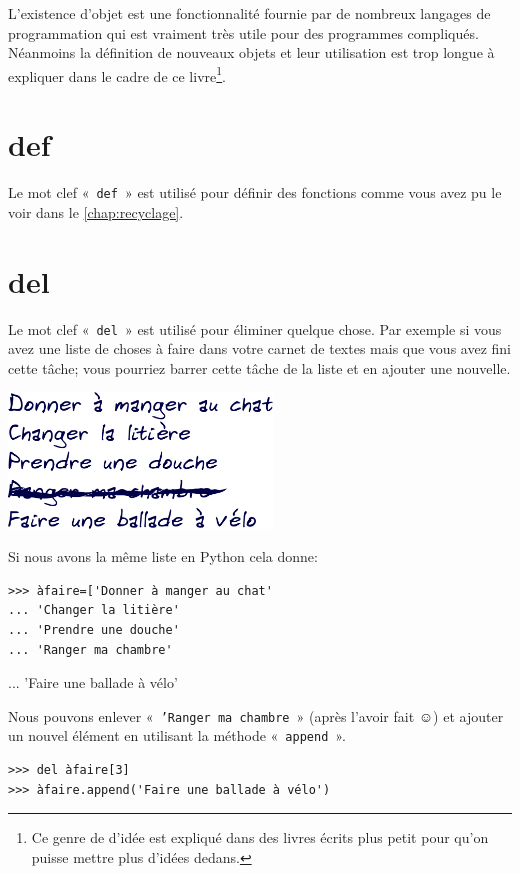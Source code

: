 L'existence d'objet est une fonctionnalité fournie par de nombreux langages de programmation qui est vraiment très utile pour des programmes compliqués. Néanmoins la définition de nouveaux objets et leur utilisation est trop longue à expliquer dans le cadre de ce livre\footnote{Ce genre de d'idée est expliqué dans des livres écrits plus petit pour qu'on puisse mettre plus d'idées dedans.}.

\section*{def}
Le mot clef « \texttt{def} » est utilisé pour définir des fonctions comme vous avez pu le voir dans le \autoref{chap:recyclage}.

\section*{del}
Le mot clef « \texttt{del} » est utilisé pour éliminer quelque chose. Par exemple si vous avez une liste de choses à faire dans votre carnet de textes mais que vous avez fini cette tâche; vous pourriez barrer cette tâche de la liste et en ajouter une nouvelle.

\begin{center}
\includegraphics*[width=70mm]{images/liste2}
\end{center}

Si nous avons la même liste en Python cela donne:
\begin{Verbatim}[frame=single,rulecolor=\color{gray}]
>>> àfaire=['Donner à manger au chat'
... 'Changer la litière'
... 'Prendre une douche'
... 'Ranger ma chambre'
\end{Verbatim}

... 'Faire une ballade à vélo'

Nous pouvons enlever « \texttt{'Ranger ma chambre} » (après l'avoir fait ☺) 
et ajouter un nouvel élément en utilisant la méthode « \texttt{append} ».

\begin{Verbatim}[frame=single,rulecolor=\color{gray}]
>>> del àfaire[3]
>>> àfaire.append('Faire une ballade à vélo')
\end{Verbatim}

